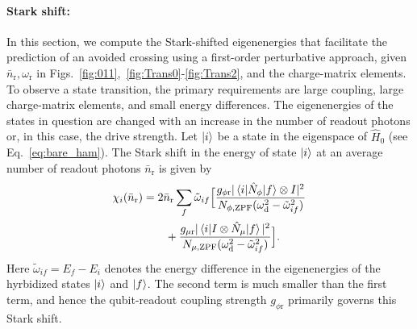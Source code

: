 \documentclass[%
reprint,
superscriptaddress,
 amsmath,amssymb,
 aps,
 prx,
longbibliography,
floatfix,
]{revtex4-2}
\begin{document}
\paragraph{Stark shift:}\label{app:stark-shift}
In this section, we compute the Stark-shifted eigenenergies that facilitate the prediction of an avoided crossing using a first-order perturbative approach, given $\bar n_\textrm{r}, \omega_\textrm{r}$ in Figs.~\ref{fig:011},~\ref{fig:Trans0}-\ref{fig:Trans2}, and the charge-matrix elements. To observe a state transition, the primary requirements are large coupling, large charge-matrix elements, and small energy differences. The eigenenergies of the states in question are changed with an increase in the number of readout photons or, in this case, the drive strength. Let $\ket{i}$ be a state in the eigenspace of $\hat H_0$ (see Eq.~\ref{eq:bare_ham}). The Stark shift in the energy of state $\ket{i}$ at an average number of readout photons $\bar n_\textrm{r}$ is given by
\begin{align}
    \chi_i(\bar n_\textrm{r})&=2\bar n_\textrm{r}\sum_{f}\tilde{\omega}_{if} \Big[\frac{g_{\phi \textrm{r}}|\braket{i|\hat N_\phi|f}\otimes I|^2}{N_{\phi,\mathrm{ZPF}}(\omega_\textrm{d}^2-\tilde{\omega}_{if} ^2)}\nonumber\\&\quad\quad+\frac{g_{\mu \textrm{r}}|\braket{i|I\otimes\hat N_\mu|f}|^2}{N_{\mu,\mathrm{ZPF}}(\omega_\textrm{d}^2-\tilde{\omega}_{if} ^2)}\Big].\label{eq:stark}
\end{align}
Here $\tilde{\omega}_{if}=E_f-E_i$ denotes the energy difference in the eigenenergies of the hyrbidized states $\ket{i}$ and $\ket{f}$. The second term is much smaller than the first term, and hence the qubit-readout coupling strength $g_{\phi \textrm{r}}$ primarily governs this Stark shift.
\end{document}
